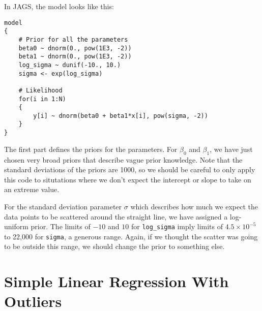 In JAGS, the model looks like this:
\begin{verbatim}
model
{
    # Prior for all the parameters
    beta0 ~ dnorm(0., pow(1E3, -2))
    beta1 ~ dnorm(0., pow(1E3, -2))
    log_sigma ~ dunif(-10., 10.)
    sigma <- exp(log_sigma)

    # Likelihood
    for(i in 1:N)
    {
        y[i] ~ dnorm(beta0 + beta1*x[i], pow(sigma, -2))
    }
}
\end{verbatim}
The first part defines the priors for the parameters. For $\beta_0$ and $\beta_1$,
we have just chosen very broad priors that describe vague prior knowledge. Note
that the standard deviations of the priors are 1000, so we should be careful
to only apply this code to situtations where we don't expect the intercept or
slope to take on an extreme value.

For the standard deviation parameter $\sigma$ which describes how much we
expect the data points to be scattered around the straight line, we have assigned
a log-uniform prior. The limits of $-10$ and $10$ for {\tt log\_sigma} imply
limits of $4.5 \times 10^{-5}$ to 22,000 for {\tt sigma}, a generous range.
Again, if we thought the scatter
was going to be outside this range, we should change the prior to something
else.



\chapter{Simple Linear Regression With Outliers}

